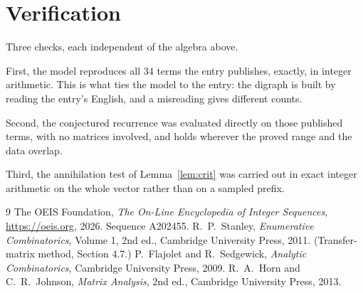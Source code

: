 \documentclass[11pt,a4paper]{article}
\theoremstyle{plain}
\theoremstyle{definition}
\begin{document}
\section{Verification}

Three checks, each independent of the algebra above.

First, the model reproduces all $34$ terms the entry publishes, exactly, in integer
arithmetic. This is what ties the model to the entry: the digraph is built by reading the
entry's English, and a misreading gives different counts.

Second, the conjectured recurrence was evaluated directly on those published terms, with no
matrices involved, and holds wherever the proved range and the data overlap.

Third, the annihilation test of Lemma~\ref{lem:crit} was carried out in exact integer
arithmetic on the whole vector rather than on a sampled prefix.

\begin{thebibliography}{9}
 The OEIS Foundation, \emph{The On-Line Encyclopedia of Integer
Sequences}, \url{https://oeis.org}, 2026. Sequence A202455.
 R.~P.~Stanley, \emph{Enumerative Combinatorics}, Volume 1, 2nd ed.,
Cambridge University Press, 2011. (Transfer-matrix method, Section 4.7.)
 P.~Flajolet and R.~Sedgewick, \emph{Analytic Combinatorics}, Cambridge
University Press, 2009.
 R.~A.~Horn and C.~R.~Johnson, \emph{Matrix Analysis}, 2nd ed., Cambridge
University Press, 2013.
\end{thebibliography}
\end{document}
